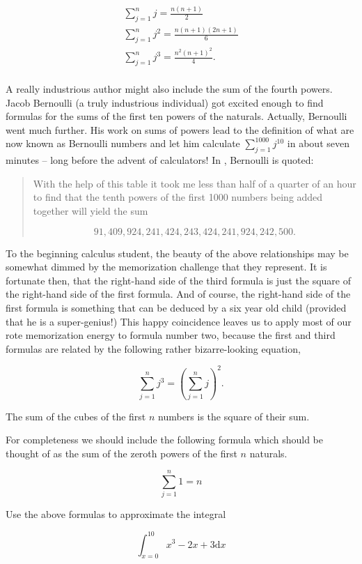 \begin{gather*}
\sum_{j=1}^n j = \frac{n(n+1)}{2}\\
\sum_{j=1}^n j^2 = \frac{n(n+1)(2n+1)}{6}\\
\sum_{j=1}^n j^3 = \frac{n^2(n+1)^2}{4}.\\
\end{gather*}

\noindent A really industrious author might also include the sum of the 
fourth powers.  Jacob Bernoulli (a truly industrious individual)
got excited enough to find formulas for the sums of the first
ten powers of the naturals.  Actually, Bernoulli went much further.  His work
on sums of powers lead to the definition of what are now known as Bernoulli
numbers and let him calculate $\sum_{j=1}^{1000}j^{10}$ in 
about seven minutes --
long before the advent of calculators!  In \cite[p. 320]{struik}, Bernoulli is 
quoted:

\begin{quote}
With the help of this table it took me less than half of a quarter of an hour
to find that the tenth powers of the first 1000 numbers being added together 
will yield the sum 

\[ 91,409,924,241,424,243,424,241,924,242,500. \]

\end{quote}

To the beginning calculus student, the beauty of the above relationships may
be somewhat dimmed by the memorization challenge that they represent.  It
is fortunate then, that the right-hand side of the third formula is just 
the square of the right-hand side of the first formula.  And of course,
the right-hand side of the first formula is something that can be deduced 
by a six year old child (provided that he is a super-genius!)  This happy
coincidence leaves us to apply most of our rote memorization energy to
formula number two, because the first and third formulas are related by
the following rather bizarre-looking equation,

\[
\sum_{j=1}^n j^3 = \left( \sum_{j=1}^n j \right)^2. 
\]       

\noindent The sum of the cubes of the first $n$ numbers is the square of their sum.

For completeness we should include the following formula which 
should be thought of as the sum of the zeroth powers of the first $n$
naturals.

\[ \sum_{j=1}^n 1 = n \]

\begin{exer}
Use the above formulas to approximate the integral

\[ \int_{x=0}^{10} x^3 - 2x +3 \mbox{d}x \]
\end{exer}
\bigskip

